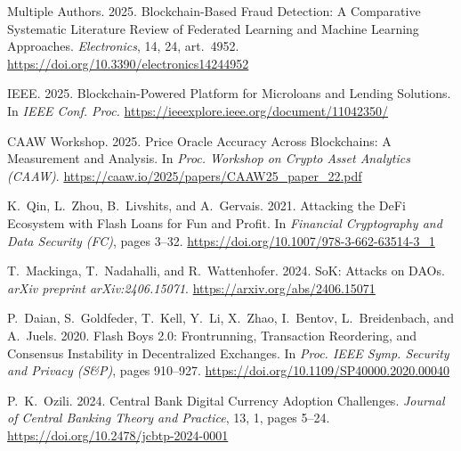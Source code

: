 \documentclass[12pt, a4paper]{report}
\begin{document}
{\begin{enumerate}[label={[\arabic*]}]
\item Multiple Authors. 2025. Blockchain-Based Fraud Detection: A Comparative Systematic Literature Review of Federated Learning and Machine Learning Approaches. \emph{Electronics}, 14, 24, art.~4952. \url{https://doi.org/10.3390/electronics14244952}

\item IEEE. 2025. Blockchain-Powered Platform for Microloans and Lending Solutions. In \emph{IEEE Conf. Proc.} \url{https://ieeexplore.ieee.org/document/11042350/}

\item CAAW Workshop. 2025. Price Oracle Accuracy Across Blockchains: A Measurement and Analysis. In \emph{Proc. Workshop on Crypto Asset Analytics (CAAW)}. \url{https://caaw.io/2025/papers/CAAW25_paper_22.pdf}

\item K.~Qin, L.~Zhou, B.~Livshits, and A.~Gervais. 2021. Attacking the DeFi Ecosystem with Flash Loans for Fun and Profit. In \emph{Financial Cryptography and Data Security (FC)}, pages 3--32. \url{https://doi.org/10.1007/978-3-662-63514-3_1}

\item T.~Mackinga, T.~Nadahalli, and R.~Wattenhofer. 2024. SoK: Attacks on DAOs. \emph{arXiv preprint arXiv:2406.15071}. \url{https://arxiv.org/abs/2406.15071}

\item P.~Daian, S.~Goldfeder, T.~Kell, Y.~Li, X.~Zhao, I.~Bentov, L.~Breidenbach, and A.~Juels. 2020. Flash Boys 2.0: Frontrunning, Transaction Reordering, and Consensus Instability in Decentralized Exchanges. In \emph{Proc. IEEE Symp. Security and Privacy (S\&P)}, pages 910--927. \url{https://doi.org/10.1109/SP40000.2020.00040}

\item P.~K.~Ozili. 2024. Central Bank Digital Currency Adoption Challenges. \emph{Journal of Central Banking Theory and Practice}, 13, 1, pages 5--24. \url{https://doi.org/10.2478/jcbtp-2024-0001}

\end{enumerate}
}
\end{document}
